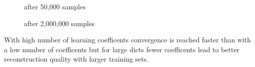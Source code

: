 


\begin{figure}[H]
\centering
{}
\hspace{15mm}
\caption{after 50,000 samples}
\label{fig:coeffsOMP50}
\end{figure}
\begin{figure}[H]
\centering
{}
\hspace{15mm}
\caption{after 2,000,000 samples}
\label{fig:coeffsOMP2000}
\end{figure}

With high number of learning coefficents convergence is reached faster than
with a low number of coefficents but for large dicts fewer coefficents lead to
better reconstruction quality with larger training sets.

